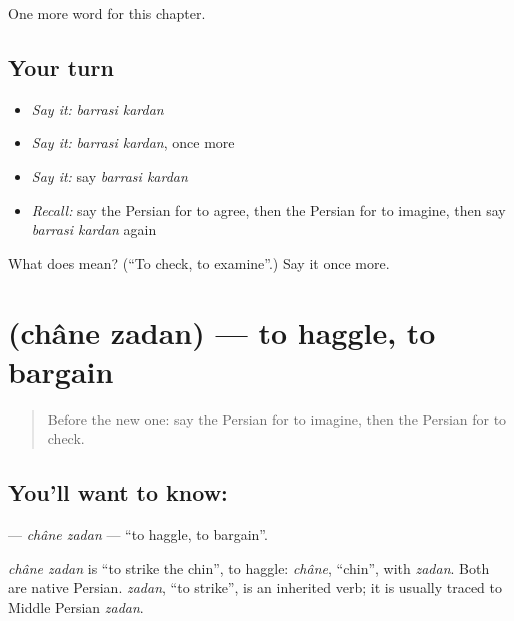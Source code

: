\begin{grammarlens}[title={What you've built}]
One more word for this chapter.
\end{grammarlens}

\subsection*{Your turn}
\begin{itemize}
\raggedright
  \item \emph{Say it:} \emph{barrasi kardan}
  \item \emph{Say it:} \emph{barrasi kardan}, once more
  \item \emph{Say it:} say \emph{barrasi kardan}
  \item \emph{Recall:} say the Persian for to agree, then the Persian for to imagine, then say \emph{barrasi kardan} again
\end{itemize}

\begin{tcolorbox}[breakable,colback=teal!4,colframe=teal!35!black,title={Before you move on}]
What does   mean? (\textquotedblleft{}To check, to examine\textquotedblright{}.) Say it once more.
\end{tcolorbox}
\section[\texorpdfstring{\fa{چانه} \fa{زدن} (châne zadan)}{چانه زدن (châne zadan)}]{  (châne zadan) — to haggle, to bargain}

\label{lesson:FA-C259-chane-zadan}



\begin{quote}
Before the new one: say the Persian for to imagine, then the Persian for to check.
\end{quote}

\subsection*{You'll want to know:  }
\textbf{ } — \emph{châne zadan} — \textquotedblleft{}to haggle, to bargain\textquotedblright{}.

\begin{cousinweb}
\emph{châne zadan} is \textquotedblleft{}to strike the chin\textquotedblright{}, to haggle: \emph{châne}, \textquotedblleft{}chin\textquotedblright{}, with \emph{zadan}. Both are native Persian. \emph{zadan}, \textquotedblleft{}to strike\textquotedblright{}, is an inherited verb; it is usually traced to Middle Persian \emph{zadan}.
\end{cousinweb}

